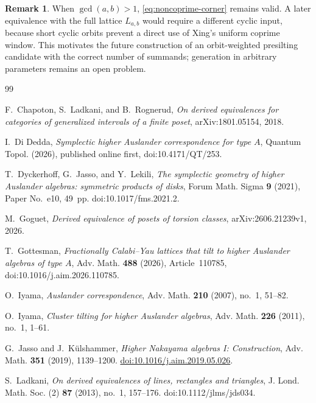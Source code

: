 \documentclass[12pt,a4paper,english,reqno]{amsart}
\theoremstyle{plain}
\theoremstyle{definition}
\newtheorem{remark}[theorem]{Remark}
\begin{document}
\begin{remark}
When $\gcd(a,b)>1$, \eqref{eq:noncoprime-corner} remains valid.  A later
equivalence with the full lattice $L_{a,b}$ would require a different
cyclic input, because short cyclic orbits prevent a direct use of Xing's
uniform coprime window.  This motivates the future construction of an
orbit-weighted presilting candidate with the correct number of summands;
generation in arbitrary parameters remains an open problem.
\end{remark}



\begin{thebibliography}{99}

F.~Chapoton, S.~Ladkani, and B.~Rognerud,
\emph{On derived equivalences for categories of generalized intervals of a
finite poset},
arXiv:1801.05154, 2018.

I.~Di Dedda,
\emph{Symplectic higher Auslander correspondence for type $A$},
Quantum Topol. (2026), published online first,
doi:10.4171/QT/253.

T.~Dyckerhoff, G.~Jasso, and Y.~Lekili,
\emph{The symplectic geometry of higher Auslander algebras: symmetric
products of disks},
Forum Math. Sigma \textbf{9} (2021), Paper No.~e10, 49~pp.
doi:10.1017/fms.2021.2.

M.~Goguet,
\emph{Derived equivalence of posets of torsion classes},
arXiv:2606.21239v1, 2026.

T.~Gottesman,
\emph{Fractionally Calabi--Yau lattices that tilt to higher Auslander
algebras of type $A$},
Adv. Math. \textbf{488} (2026), Article~110785,
doi:10.1016/j.aim.2026.110785.

O.~Iyama,
\emph{Auslander correspondence},
Adv. Math. \textbf{210} (2007), no.~1, 51--82.

O.~Iyama,
\emph{Cluster tilting for higher Auslander algebras},
Adv. Math. \textbf{226} (2011), no.~1, 1--61.

G.~Jasso and J.~K\"ulshammer,
\emph{Higher Nakayama algebras I: Construction},
Adv. Math. \textbf{351} (2019), 1139--1200.
\href{https://doi.org/10.1016/j.aim.2019.05.026}
{doi:10.1016/j.aim.2019.05.026}.



S.~Ladkani,
\emph{On derived equivalences of lines, rectangles and triangles},
J. Lond. Math. Soc. (2) \textbf{87} (2013), no.~1, 157--176.
doi:10.1112/jlms/jds034.


\end{thebibliography}
\end{document}

